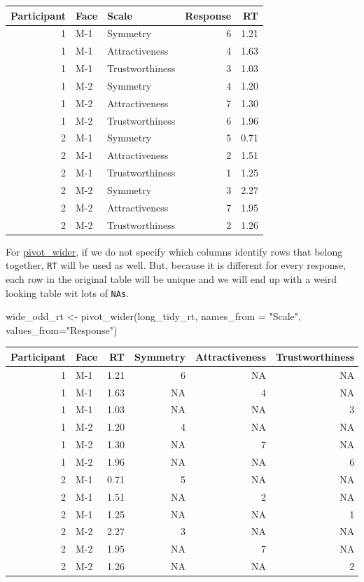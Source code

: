 \documentclass[
]{book}
\newenvironment{Shaded}{\begin{snugshade}}{\end{snugshade}}
\newcommand{\AttributeTok}[1]{\textcolor[rgb]{0.77,0.63,0.00}{#1}}
\newcommand{\FunctionTok}[1]{\textcolor[rgb]{0.00,0.00,0.00}{#1}}
\newcommand{\NormalTok}[1]{#1}
\newcommand{\OtherTok}[1]{\textcolor[rgb]{0.56,0.35,0.01}{#1}}
\newcommand{\StringTok}[1]{\textcolor[rgb]{0.31,0.60,0.02}{#1}}
\begin{document}
\begin{tabular}{r|l|l|r|r}
\hline
Participant & Face & Scale & Response & RT\\
\hline
1 & M-1 & Symmetry & 6 & 1.21\\
\hline
1 & M-1 & Attractiveness & 4 & 1.63\\
\hline
1 & M-1 & Trustworthiness & 3 & 1.03\\
\hline
1 & M-2 & Symmetry & 4 & 1.20\\
\hline
1 & M-2 & Attractiveness & 7 & 1.30\\
\hline
1 & M-2 & Trustworthiness & 6 & 1.96\\
\hline
2 & M-1 & Symmetry & 5 & 0.71\\
\hline
2 & M-1 & Attractiveness & 2 & 1.51\\
\hline
2 & M-1 & Trustworthiness & 1 & 1.25\\
\hline
2 & M-2 & Symmetry & 3 & 2.27\\
\hline
2 & M-2 & Attractiveness & 7 & 1.95\\
\hline
2 & M-2 & Trustworthiness & 2 & 1.26\\
\hline
\end{tabular}

For \href{https://tidyr.tidyverse.org/reference/pivot_wider.html}{pivot\_wider}, if we do not specify which columns identify rows that belong together, \texttt{RT} will be used as well. But, because it is different for every response, each row in the original table will be unique and we will end up with a weird looking table wit lots of \texttt{NAs}.

\begin{Shaded}
\begin{Highlighting}[]
\NormalTok{wide\_odd\_rt }\OtherTok{\textless{}{-}}
  \FunctionTok{pivot\_wider}\NormalTok{(long\_tidy\_rt, }\AttributeTok{names\_from =} \StringTok{"Scale"}\NormalTok{, }\AttributeTok{values\_from=}\StringTok{"Response"}\NormalTok{)}
\end{Highlighting}
\end{Shaded}

\begin{tabular}{r|l|r|r|r|r}
\hline
Participant & Face & RT & Symmetry & Attractiveness & Trustworthiness\\
\hline
1 & M-1 & 1.21 & 6 & NA & NA\\
\hline
1 & M-1 & 1.63 & NA & 4 & NA\\
\hline
1 & M-1 & 1.03 & NA & NA & 3\\
\hline
1 & M-2 & 1.20 & 4 & NA & NA\\
\hline
1 & M-2 & 1.30 & NA & 7 & NA\\
\hline
1 & M-2 & 1.96 & NA & NA & 6\\
\hline
2 & M-1 & 0.71 & 5 & NA & NA\\
\hline
2 & M-1 & 1.51 & NA & 2 & NA\\
\hline
2 & M-1 & 1.25 & NA & NA & 1\\
\hline
2 & M-2 & 2.27 & 3 & NA & NA\\
\hline
2 & M-2 & 1.95 & NA & 7 & NA\\
\hline
2 & M-2 & 1.26 & NA & NA & 2\\
\hline
\end{tabular}
\end{document}
